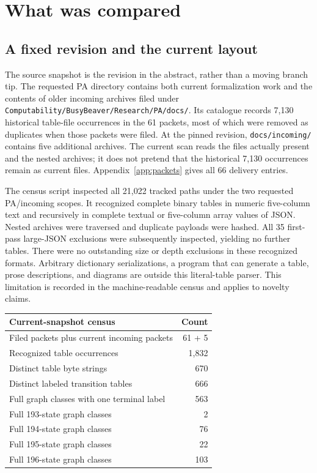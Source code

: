 \documentclass[11pt,letterpaper]{article}
\newcommand{\file}[1]{\texttt{\nolinkurl{#1}}}
\begin{document}
\section{What was compared}
\label{sec:comparison}

\subsection{A fixed revision and the current layout}

The source snapshot is the revision in the abstract, rather than a moving
branch tip. The requested PA directory contains both current formalization
work and the contents of older incoming archives filed under
\file{Computability/BusyBeaver/Research/PA/docs/}. Its catalogue records
7,130 historical table-file occurrences in the 61 packets, most of which
were removed as duplicates when those packets were filed. At the pinned
revision, \file{docs/incoming/} contains five additional archives. The
current scan reads the files actually present and the nested archives;
it does not pretend that the historical 7,130 occurrences remain as
current files. Appendix~\ref{app:packets} gives all 66 delivery entries.

The census script inspected all 21,022 tracked paths under the two
requested PA/incoming scopes. It recognized complete binary tables in
numeric five-column text and recursively in complete textual or five-column
array values of JSON. Nested archives were traversed and duplicate payloads
were hashed. All 35 first-pass large-JSON exclusions were subsequently
inspected, yielding no further tables. There were no outstanding size or
depth exclusions in these recognized formats. Arbitrary dictionary
serializations, a program that can generate a table, prose descriptions,
and diagrams are outside this literal-table parser. This limitation is
recorded in the machine-readable census and applies to novelty claims.

\begin{center}
\begin{tabular}{@{}lr@{}}
\toprule Current-snapshot census &Count\\\midrule
Filed packets plus current incoming packets &61 + 5\\
Recognized table occurrences &1,832\\
Distinct table byte strings &670\\
Distinct labeled transition tables &666\\
Full graph classes with one terminal label &563\\
Full 193-state graph classes &2\\
Full 194-state graph classes &76\\
Full 195-state graph classes &22\\
Full 196-state graph classes &103\\
\bottomrule
\end{tabular}
\end{center}
\end{document}
